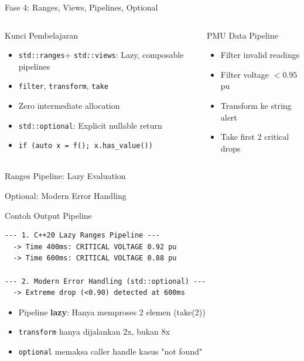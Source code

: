 \documentclass[aspectratio=169,10pt]{beamer}
\newcommand{\optional}{\texttt{std::optional}}
\newcommand{\ranges}{\texttt{std::ranges}}
\newcommand{\views}{\texttt{std::views}}
\begin{document}
\begin{frame}{Fase 4: Ranges, Views, Pipelines, Optional}
  \begin{columns}[T]
    \begin{block}{Kunci Pembelajaran}
      \begin{itemize}
        \item \ranges + \views: Lazy, composable pipelines
        \item \texttt{filter}, \texttt{transform}, \texttt{take}
        \item Zero intermediate allocation
        \item \optional: Explicit nullable return
        \item \texttt{if (auto x = f(); x.has\_value())}
      \end{itemize}
    \end{block}
    \begin{exampleblock}{PMU Data Pipeline}
      \begin{itemize}
        \item Filter invalid readings
        \item Filter voltage $< 0.95$ pu
        \item Transform ke string alert
        \item Take first 2 critical drops
      \end{itemize}
    \end{exampleblock}
  \end{columns}
\end{frame}

\begin{frame}[fragile]{Ranges Pipeline: Lazy Evaluation}
  
\end{frame}

\begin{frame}[fragile]{Optional: Modern Error Handling}
  
\end{frame}

\begin{frame}[fragile]{Contoh Output Pipeline}
  \begin{verbatim}
--- 1. C++20 Lazy Ranges Pipeline ---
  -> Time 400ms: CRITICAL VOLTAGE 0.92 pu
  -> Time 600ms: CRITICAL VOLTAGE 0.88 pu

--- 2. Modern Error Handling (std::optional) ---
  -> Extreme drop (<0.90) detected at 600ms
  \end{verbatim}
  
  \vspace{0.3cm}
  \begin{itemize}
    \item Pipeline \textbf{lazy}: Hanya memproses 2 elemen (take(2))
    \item \texttt{transform} hanya dijalankan 2x, bukan 8x
    \item \texttt{optional} memaksa caller handle kasus "not found"
  \end{itemize}
\end{frame}
\end{document}
